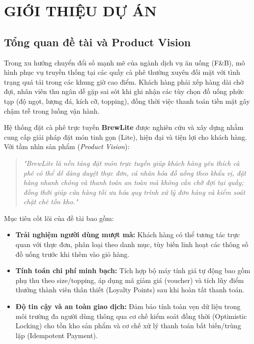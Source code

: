 \documentclass[12pt,a4paper,oneside]{report}
\begin{document}


\setcounter{page}{1}

\tableofcontents
\newpage
\listoffigures
\newpage
\listoftables
\newpage

\setcounter{page}{1}


\chapter{GIỚI THIỆU DỰ ÁN}

\section{Tổng quan đề tài và Product Vision}
Trong xu hướng chuyển đổi số mạnh mẽ của ngành dịch vụ ăn uống (F\&B), mô hình phục vụ truyền thống tại các quầy cà phê thường xuyên đối mặt với tình trạng quá tải trong các khung giờ cao điểm. Khách hàng phải xếp hàng dài chờ đợi, nhân viên thu ngân dễ gặp sai sót khi ghi nhận các tùy chọn đồ uống phức tạp (độ ngọt, lượng đá, kích cỡ, topping), đồng thời việc thanh toán tiền mặt gây chậm trễ trong luồng vận hành.

Hệ thống đặt cà phê trực tuyến \textbf{BrewLite} được nghiên cứu và xây dựng nhằm cung cấp giải pháp đặt món tinh gọn (Lite), hiện đại và tiện lợi cho khách hàng. Với tầm nhìn sản phẩm (\textit{Product Vision}):
\begin{quote}
    \textit{"BrewLite là nền tảng đặt món trực tuyến giúp khách hàng yêu thích cà phê có thể dễ dàng duyệt thực đơn, cá nhân hóa đồ uống theo khẩu vị, đặt hàng nhanh chóng và thanh toán an toàn mà không cần chờ đợi tại quầy; đồng thời giúp cửa hàng tối ưu hóa quy trình xử lý đơn hàng và kiểm soát chặt chẽ tồn kho."}
\end{quote}

Mục tiêu cốt lõi của đề tài bao gồm:
\begin{itemize}
    \item \textbf{Trải nghiệm người dùng mượt mà:} Khách hàng có thể tương tác trực quan với thực đơn, phân loại theo danh mục, tùy biến linh hoạt các thông số đồ uống trước khi thêm vào giỏ hàng.
    \item \textbf{Tính toán chi phí minh bạch:} Tích hợp bộ máy tính giá tự động bao gồm phụ thu theo size/topping, áp dụng mã giảm giá (voucher) và tích lũy điểm thưởng thành viên thân thiết (Loyalty Points) sau khi hoàn tất thanh toán.
    \item \textbf{Độ tin cậy và an toàn giao dịch:} Đảm bảo tính toàn vẹn dữ liệu trong môi trường đa người dùng thông qua cơ chế kiểm soát đồng thời (Optimistic Locking) cho tồn kho sản phẩm và cơ chế xử lý thanh toán bất biến/trùng lặp (Idempotent Payment).
\end{itemize}
\end{document}
